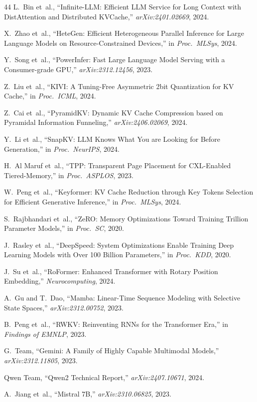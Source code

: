\documentclass[conference]{IEEEtran}
\begin{document}
\begin{thebibliography}{44}
 L.~Bin et~al., ``Infinite-LLM: Efficient LLM Service for Long Context with DistAttention and Distributed KVCache,'' \textit{arXiv:2401.02669}, 2024.

 X.~Zhao et~al., ``HeteGen: Efficient Heterogeneous Parallel Inference for Large Language Models on Resource-Constrained Devices,'' in \textit{Proc.\ MLSys}, 2024.

 Y.~Song et~al., ``PowerInfer: Fast Large Language Model Serving with a Consumer-grade GPU,'' \textit{arXiv:2312.12456}, 2023.

 Z.~Liu et~al., ``KIVI: A Tuning-Free Asymmetric 2bit Quantization for KV Cache,'' in \textit{Proc.\ ICML}, 2024.

 Z.~Cai et~al., ``PyramidKV: Dynamic KV Cache Compression based on Pyramidal Information Funneling,'' \textit{arXiv:2406.02069}, 2024.

 Y.~Li et~al., ``SnapKV: LLM Knows What You are Looking for Before Generation,'' in \textit{Proc.\ NeurIPS}, 2024.

 H.~Al Maruf et~al., ``TPP: Transparent Page Placement for CXL-Enabled Tiered-Memory,'' in \textit{Proc.\ ASPLOS}, 2023.

 W.~Peng et~al., ``Keyformer: KV Cache Reduction through Key Tokens Selection for Efficient Generative Inference,'' in \textit{Proc.\ MLSys}, 2024.

 S.~Rajbhandari et~al., ``ZeRO: Memory Optimizations Toward Training Trillion Parameter Models,'' in \textit{Proc.\ SC}, 2020.

 J.~Rasley et~al., ``DeepSpeed: System Optimizations Enable Training Deep Learning Models with Over 100 Billion Parameters,'' in \textit{Proc.\ KDD}, 2020.

 J.~Su et~al., ``RoFormer: Enhanced Transformer with Rotary Position Embedding,'' \textit{Neurocomputing}, 2024.

 A.~Gu and T.~Dao, ``Mamba: Linear-Time Sequence Modeling with Selective State Spaces,'' \textit{arXiv:2312.00752}, 2023.

 B.~Peng et~al., ``RWKV: Reinventing RNNs for the Transformer Era,'' in \textit{Findings of EMNLP}, 2023.

 G.~Team, ``Gemini: A Family of Highly Capable Multimodal Models,'' \textit{arXiv:2312.11805}, 2023.

 Qwen Team, ``Qwen2 Technical Report,'' \textit{arXiv:2407.10671}, 2024.

 A.~Jiang et~al., ``Mistral 7B,'' \textit{arXiv:2310.06825}, 2023.

\end{thebibliography}
\end{document}
